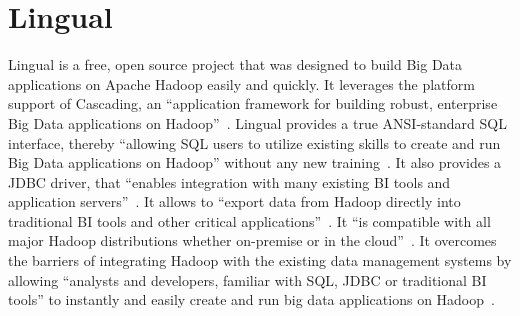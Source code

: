 \section{Lingual}

Lingual is a free, open source project that was designed to build Big Data
applications on Apache Hadoop easily and quickly. It leverages the platform
support of Cascading, an ``application framework for building robust, enterprise
Big Data applications on Hadoop''~\cite{hid-sp18-516-drivenio-lingual}. Lingual
provides a true ANSI-standard SQL interface, thereby ``allowing SQL users to
utilize existing skills to create and run Big Data applications on Hadoop''
without any new training~\cite{hid-sp18-516-drivenio-lingual}. It also provides
a JDBC driver, that ``enables integration with many existing BI tools and
application servers''~\cite{hid-sp18-516-cascading}. It allows to ``export data
from Hadoop directly into traditional BI tools and other critical
applications''~\cite{hid-sp18-516-cascading}. It ``is compatible with all major
Hadoop distributions whether on-premise or in the
cloud''~\cite{hid-sp18-516-drivenio-lingual}. It overcomes the barriers of
integrating Hadoop with the existing data management systems by allowing
``analysts and developers, familiar with SQL, JDBC or traditional BI tools'' to
instantly and easily create and run big data applications on
Hadoop~\cite{hid-sp18-516-drivenio-lingual}.

